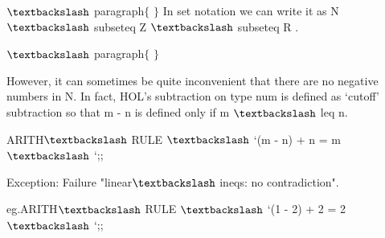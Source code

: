 \documentclass[12pt]{article}
\renewcommand{\_}{\kern-1.5pt\textunderscore\kern-1.5pt}
\begin{document}
\vspace{\baselineskip}
\begin{FlushLeft}
{\fontsize{14pt}{16.8pt}\selectfont $\textbackslash$ paragraph$ \{ $ $ \} $  In set notation we can write it as N $\textbackslash$ subseteq Z $\textbackslash$ subseteq R .\par}
\end{FlushLeft}\par


\vspace{\baselineskip}
\begin{FlushLeft}
{\fontsize{14pt}{16.8pt}\selectfont $\textbackslash$ paragraph$ \{ $ $ \} $ \par}
\end{FlushLeft}\par

\begin{FlushLeft}
{\fontsize{14pt}{16.8pt}\selectfont However, it can sometimes be quite inconvenient that there are no negative numbers in N. In fact, HOL’s subtraction on type num is defined as ‘cutoff’ subtraction so that m - n is defined only if m $\textbackslash$ leq n.\par}
\end{FlushLeft}\par


\vspace{\baselineskip}
\begin{FlushLeft}
{\fontsize{14pt}{16.8pt}\selectfont ARITH$\textbackslash$ \_RULE $\textbackslash$ `(m - n) + n = m$\textbackslash$ `;;\par}
\end{FlushLeft}\par


\vspace{\baselineskip}
\begin{FlushLeft}
{\fontsize{14pt}{16.8pt}\selectfont Exception: Failure "linear$\textbackslash$ \_ineqs: no contradiction".\par}
\end{FlushLeft}\par


\vspace{\baselineskip}
\begin{FlushLeft}
{\fontsize{14pt}{16.8pt}\selectfont eg.ARITH$\textbackslash$ \_RULE $\textbackslash$ `(1 - 2) + 2 = 2$\textbackslash$ `;;\par}
\end{FlushLeft}\par
\end{document}
